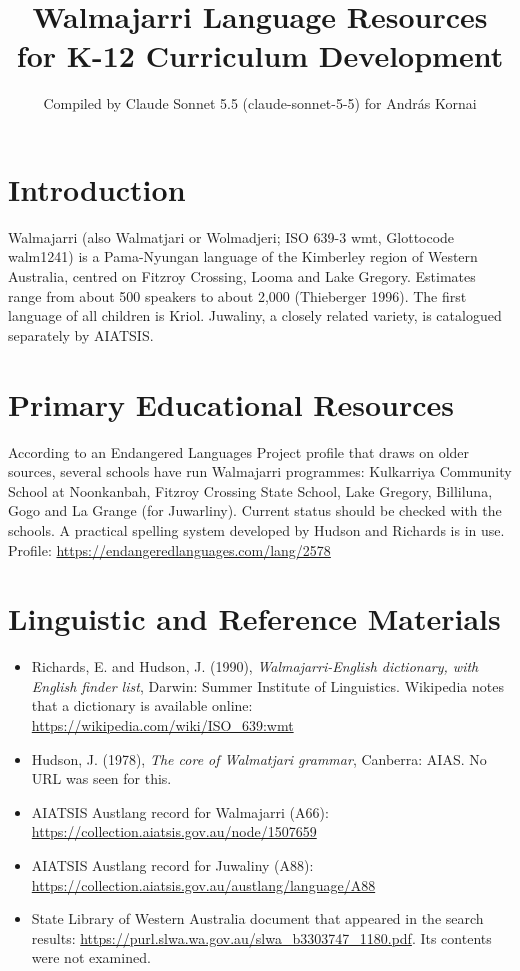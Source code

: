 \documentclass[12pt]{article}
\title{Walmajarri Language Resources for K-12 Curriculum Development}
\author{Compiled by Claude Sonnet 5.5 (claude-sonnet-5-5) for Andr\'as Kornai}
\date{}
\begin{document}
\maketitle

\section{Introduction}
Walmajarri (also Walmatjari or Wolmadjeri; ISO 639-3 wmt, Glottocode walm1241) is a Pama-Nyungan language of the Kimberley region of Western Australia, centred on Fitzroy Crossing, Looma and Lake Gregory. Estimates range from about 500 speakers to about 2,000 (Thieberger 1996). The first language of all children is Kriol. Juwaliny, a closely related variety, is catalogued separately by AIATSIS.

\section{Primary Educational Resources}
According to an Endangered Languages Project profile that draws on older sources, several schools have run Walmajarri programmes: Kulkarriya Community School at Noonkanbah, Fitzroy Crossing State School, Lake Gregory, Billiluna, Gogo and La Grange (for Juwarliny). Current status should be checked with the schools. A practical spelling system developed by Hudson and Richards is in use. Profile: \url{https://endangeredlanguages.com/lang/2578}

\section{Linguistic and Reference Materials}
\begin{itemize}
\item Richards, E. and Hudson, J. (1990), \emph{Walmajarri-English dictionary, with English finder list}, Darwin: Summer Institute of Linguistics. Wikipedia notes that a dictionary is available online: \url{https://wikipedia.com/wiki/ISO_639:wmt}
\item Hudson, J. (1978), \emph{The core of Walmatjari grammar}, Canberra: AIAS. No URL was seen for this.
\item AIATSIS Austlang record for Walmajarri (A66): \url{https://collection.aiatsis.gov.au/node/1507659}
\item AIATSIS Austlang record for Juwaliny (A88): \url{https://collection.aiatsis.gov.au/austlang/language/A88}
\item State Library of Western Australia document that appeared in the search results: \url{https://purl.slwa.wa.gov.au/slwa_b3303747_1180.pdf}. Its contents were not examined.
\end{itemize}
\end{document}
